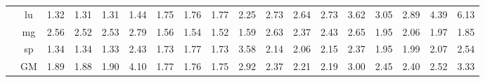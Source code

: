 \begin{table*}[]
\begin{center}
{\begin{tabular}{|c|c|rrrr|rrrr|rrrr|rrrr|}
 &  lu  &  1.32  & \cellcolor{blue!25} 1.31  &  1.31  &   1.44  &  1.75  &  1.76  &  1.77  &  2.25  &  2.73  & \cellcolor{blue!25} 2.64  &  2.73  &  3.62  &  3.05  & \cellcolor{blue!25} 2.89  &  4.39  &  6.13 \\
 &  mg  &  2.56  & \cellcolor{blue!25} 2.52  &  2.53  &   2.79  &  1.56  & \cellcolor{blue!25} 1.54  & \cellcolor{blue!25} 1.52  &  1.59  &  2.63  & \cellcolor{blue!25} 2.37  &  2.43  &  2.65  &  1.95  &  2.06  & \cellcolor{blue!25} 1.97  &  1.85 \\
 &  sp  &  1.34  &  1.34  & \cellcolor{blue!25} 1.33  &   2.43  &  1.73  &  1.77  & \cellcolor{blue!25} 1.73  &  3.58  &  2.14  & \cellcolor{blue!25} 2.06  &  2.15  &  2.37  &  1.95  &  1.99  &  2.07  &  2.54 \\
 &  GM  &  1.89  & \cellcolor{blue!25} 1.88  &  1.90  &   4.10  &  1.77  & \cellcolor{blue!25} 1.76  & \cellcolor{blue!25} 1.75  &  2.92  &  2.37  & \cellcolor{blue!25} 2.21  & \cellcolor{blue!25} 2.19  &  3.00  &  2.45  & \cellcolor{blue!25} 2.40  &  2.52  &  3.33 \\
\hline 
\end{tabular} }

\end{center}
\end{table*}
